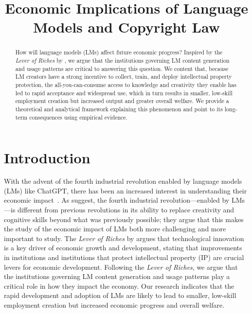 \documentclass{article} %
\title{Economic Implications of Language Models and Copyright Law}
\begin{document}
\maketitle
\begin{abstract}
How will language models (LMs) affect future economic progress?
Inspired by the \emph{Lever of Riches} by \citet{mokyr1992lever}, we argue that the institutions governing LM content generation and usage patterns are critical to answering this question.
We content that, because LM creators have a strong incentive to collect, train, and deploy intellectual property protection, the all-you-can-consume access to knowledge and creativity they enable has led to rapid acceptance and widespread use, which in turn results in smaller, low-skill employment creation but increased output and greater overall welfare.
We provide a theoretical and analytical framework explaining this phenomenon and point to its long-term consequences using empirical evidence.
\end{abstract}

\section{Introduction}


\label{Intro}

With the advent of the fourth industrial revolution enabled by language models (LMs) like ChatGPT, there has been an increased interest in understanding their economic impact~\citep{Howard2019artificial, autor2015there, hui2024short, felten2023will, eloundou2023gpts, paslar2023role}.
As \citet{boiko2023emergent} suggest, the fourth industrial revolution---enabled by LMs---is different from previous revolutions in its ability to replace creativity and cognitive skills beyond what was previously possible; they argue that this makes the study of the economic impact of LMs both more challenging and more important to study.
The \emph{Lever of Riches} by \citet{mokyr1992lever} argues that technological innovation is a key driver of economic growth and development, stating that improvements in institutions and institutions that protect intellectual property (IP) are crucial levers for economic development.
Following the \emph{Lever of Riches}, we argue that the institutions governing LM content generation and usage patterns play a critical role in how they impact the economy.
Our research indicates that the rapid development and adoption of LMs are likely to lead to smaller, low-skill employment creation but increased economic progress and overall welfare. 
\end{document}
